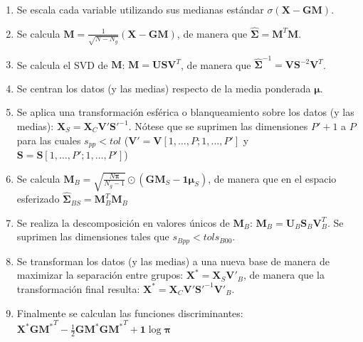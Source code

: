 \documentclass[12pt]{article}
\begin{document}
\begin{enumerate}
    \item Se escala cada variable utilizando sus medianas estándar $\sigma(\mathbf{X} - \mathbf{GM})$.
    \item Se calcula $\mathbf{M} = \frac{1}{\sqrt{N - N_g}} (\mathbf{X} - \mathbf{GM})$, de manera que $\hat{\boldsymbol{\Sigma}} = \mathbf{M}^T \mathbf{M}$.
    \item Se calcula el SVD de $\mathbf{M}$: $\mathbf{M} = \mathbf{U} \mathbf{S} \mathbf{V}^T$, de manera que $\hat{\boldsymbol{\Sigma}}^{-1} = \mathbf{V} \mathbf{S}^{-2} \mathbf{V}^T$.
    \item Se centran los datos (y las medias) respecto de la media ponderada $\boldsymbol{\mu}$.
    \item Se aplica una transformación esférica o blanqueamiento sobre los datos (y las medias): 
    $\mathbf{X}_S = \mathbf{X}_C \mathbf{V}' \mathbf{S}'^{-1}$. Nótese que se suprimen las dimensiones $P' + 1$ a $P$ para las cuales $s_{pp} < tol$ ($\mathbf{V}' = \mathbf{V}[1,\ldots,P;1,\ldots,P']$ y $\mathbf{S} = \mathbf{S}[1,\ldots,P';1,\ldots,P']$)
    \item Se calcula $\mathbf{M}_B = \sqrt{\frac{N \boldsymbol{\pi}}{N_g - 1}} \odot  (\mathbf{GM}_S - \mathbf{1}\boldsymbol{\mu}_S)$, de manera que en el espacio esferizado $\hat{\boldsymbol{\Sigma}}_{BS} = \mathbf{M}_B^T \mathbf{M}_B$
    \item Se realiza la descomposición en valores únicos de $\mathbf{M}_B$: $\mathbf{M}_B = \mathbf{U}_B \mathbf{S}_B \mathbf{V}_B^T$. Se suprimen las dimensiones tales que $s_{Bpp} < tol s_{B00}$.
    \item Se transforman los datos (y las medias) a una nueva base de manera de maximizar la separación entre grupos: $\mathbf{X}^* = \mathbf{X}_S \mathbf{V}'_B$, de manera que la transformación final resulta: $\mathbf{X}^* = \mathbf{X}_C \mathbf{V}' \mathbf{S}'^{-1} \mathbf{V}'_B$.
    \item Finalmente se calculan las funciones discriminantes: $\mathbf{X}^* {\mathbf{GM}^*}^T - \frac{1}{2} \mathbf{GM}^* {\mathbf{GM}^*}^T + \mathbf{1} \log \boldsymbol{\pi} $
\end{enumerate}
\end{document}
